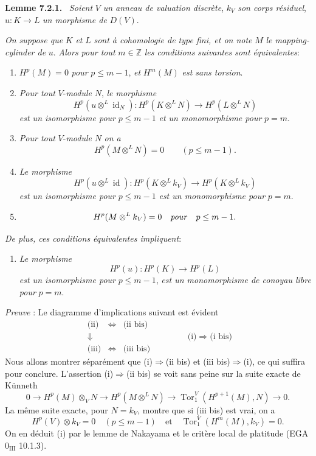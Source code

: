 \documentclass[11pt]{article}
\newenvironment{statement}[1]{\par\medskip\noindent\textbf{#1.}\ }{\par\medskip}
\begin{document}
\begin{statement}{Lemme 7.2.1}
\emph{Soient} $V$ \emph{un anneau de valuation discrète}, $k_V$ \emph{son corps résiduel}, $u:K\to L$ \emph{un morphisme de} $D(V)$.

\emph{On suppose que} $K$ \emph{et} $L$ \emph{sont à cohomologie de type fini, et on note} $M$ \emph{le mapping-cylinder de} $u$. \emph{Alors pour tout} $m\in\mathbb Z$ \emph{les conditions suivantes sont équivalentes}:
\begin{enumerate}[label=(\roman*)]
\item $H^p(M)=0$ \emph{pour} $p\le m-1$, \emph{et} $H^m(M)$ \emph{est sans torsion}.
\item
\emph{Pour tout} $V$-\emph{module} $N$, \emph{le morphisme}
\[
H^p(u\otimes^L\operatorname{id}_N):H^p(K\otimes^L N)\to H^p(L\otimes^L N)
\]
\emph{est un isomorphisme pour} $p\le m-1$ \emph{et un monomorphisme pour} $p=m$.
\item[(ii bis)] \emph{Pour tout} $V$-\emph{module} $N$ \emph{on a}
\[
H^p(M\otimes^L N)=0\qquad(p\le m-1).
\]
\item \emph{Le morphisme}
\[
H^p(u\otimes^L\operatorname{id}):H^p(K\otimes^L k_V)\to H^p(K\otimes^L k_V)
\]
\emph{est un isomorphisme pour} $p\le m-1$ \emph{est un monomorphisme pour} $p=m$.
\item[(iii bis)]
\[
H^p(M\otimes^L k_V)=0\quad\text{\emph{pour}}\quad p\le m-1.
\]
\end{enumerate}
\emph{De plus, ces conditions équivalentes impliquent}:
\begin{enumerate}[label=(\roman* bis)]
\item \emph{Le morphisme}
\[
H^p(u):H^p(K)\to H^p(L)
\]
\emph{est un isomorphisme pour} $p\le m-1$, \emph{est un monomorphisme de conoyau libre pour} $p=m$.
\end{enumerate}
\end{statement}

\emph{Preuve} : Le diagramme d'implications suivant est évident
\[
\begin{array}{ccc}
\text{(ii)}&\Leftrightarrow&\text{(ii bis)}\\
\Downarrow&&\\
\text{(iii)}&\Leftrightarrow&\text{(iii bis)}
\end{array}
\qquad\qquad
\text{(i)}\Rightarrow\text{(i bis)}
\]
Nous allons montrer séparément que (i)$\Rightarrow$(ii bis) et (iii bis)$\Rightarrow$(i), ce qui suffira pour conclure. L'assertion (i)$\Rightarrow$(ii bis) se voit sans peine sur la suite exacte de Künneth
\[
0\to H^p(M)\otimes_V N\to H^p(M\otimes^L N)\to \operatorname{Tor}_1^V(H^{p+1}(M),N)\to0.
\]
La même suite exacte, pour $N=k_V$, montre que si (iii bis) est vrai, on a
\[
H^p(V)\otimes k_V=0\quad(p\le m-1)\quad\text{et}\quad
\operatorname{Tor}_1^V(H^m(M),k_V)=0.
\]
On en
déduit (i) par le lemme de Nakayama et le critère local de platitude (EGA $0_{\mathrm{III}}$ 10.1.3).
\end{document}
